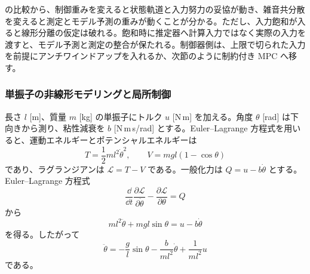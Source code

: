  の比較から、制御重みを変えると状態軌道と入力努力の妥協が動き、雑音共分散を変えると測定とモデル予測の重みが動くことが分かる。ただし、入力飽和が入ると線形分離の仮定は破れる。飽和時に推定器へ計算入力ではなく実際の入力を渡すと、モデル予測と測定の整合が保たれる。制御器側は、上限で切られた入力を前提にアンチワインドアップを入れるか、次節のように制約付き MPC へ移す。

\subsubsection{単振子の非線形モデリングと局所制御}

長さ $l$ [m]、質量 $m$ [kg] の単振子にトルク $u$ [N\,m] を加える。角度 $\theta$ [rad] は下向きから測り、粘性減衰を $b$ [N\,m\,s/rad] とする。Euler--Lagrange 方程式を用いると、運動エネルギーとポテンシャルエネルギーは
\begin{equation}
  T=\frac{1}{2}ml^2\dot{\theta}^2,
  \qquad
  V=mgl(1-\cos\theta)
\end{equation}
であり、ラグランジアンは $\mathcal{L}=T-V$ である。一般化力は $Q=u-b\dot{\theta}$ とする。Euler--Lagrange 方程式
\begin{equation}
  \frac{\dd}{\dd t}
  \frac{\partial\mathcal{L}}{\partial\dot{\theta}}
  -
  \frac{\partial\mathcal{L}}{\partial\theta}
  =
  Q
\end{equation}
から
\begin{equation}
  ml^2\ddot{\theta}+mgl\sin\theta
  =
  u-b\dot{\theta}
\end{equation}
を得る。したがって
\begin{equation}
  \ddot{\theta}
  =
  -\frac{g}{l}\sin\theta
  -\frac{b}{ml^2}\dot{\theta}
  +\frac{1}{ml^2}u
\end{equation}
である。

